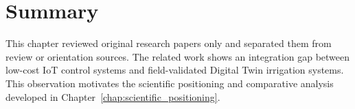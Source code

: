 \section{Summary}

This chapter reviewed original research papers only and separated them from review or orientation sources. The related work shows an integration gap between low-cost IoT control systems and field-validated Digital Twin irrigation systems. This observation motivates the scientific positioning and comparative analysis developed in Chapter~\ref{chap:scientific_positioning}.
